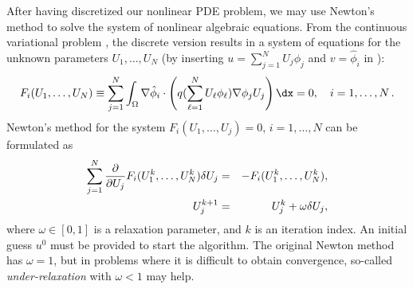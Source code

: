 After having discretized our nonlinear PDE problem, we may
use Newton's method to solve the system of nonlinear algebraic equations.
From the continuous variational problem ,
the discrete version  results in a
system of equations for the unknown parameters $U_1,\ldots, U_N$
(by inserting $u = \sum_{j=1}^N U_j \phi_j$ 
and $v=\hat\phi_i$ in ):
\begin{equation}
\label{langtangen:nonlinear:Newton:F1}
F_i(U_1,\ldots,U_N) \equiv
\sum_{j=1}^N
\int_\Omega \nabla \hat\phi_i\cdot\left( q(\sum_{\ell=1}^NU_\ell\phi_\ell)
\nabla \phi_j U_j\right)\dx = 0,\quad i=1,\ldots,N\langtangenep
\end{equation}
Newton's method for the system $F_i(U_1,\ldots,U_j)=0$, $i=1,\ldots,N$
can be formulated as
\begin{eqnarray}
\sum_{j=1}^N 
{\partial \over\partial U_j} F_i(U_1^k,\ldots,U_N^k)\delta U_j
&=& -F_i(U_1^k,\ldots,U_N^k),\\
U_j^{k+1} &=& U_j^k + \omega\delta U_j,
\end{eqnarray}
where $\omega\in [0,1]$ is a relaxation parameter, and $k$ is
an iteration index. An initial guess $u^0$ must
be provided to start the algorithm.
The original Newton method has $\omega=1$, but in problems where it is
difficult to obtain convergence, so-called \emph{under-relaxation} with $\omega < 1$ may help.

